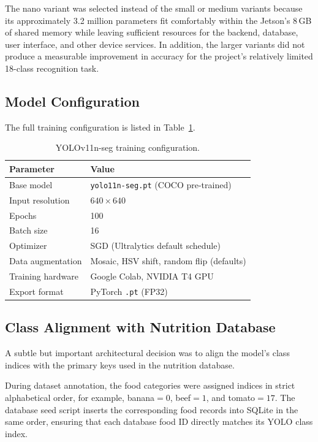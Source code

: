 \documentclass[11pt,a4paper]{article}
\begin{document}
The nano variant was selected instead of the small or medium variants because its approximately 3.2 million parameters fit comfortably within the Jetson's 8\,GB of shared memory while leaving sufficient resources for the backend, database, user interface, and other device services. In addition, the larger variants did not produce a measurable improvement in accuracy for the project's relatively limited 18-class recognition task.

\subsection{Model Configuration}

The full training configuration is listed in Table~\ref{tab:training}.

\begin{table}[H]
  \centering
  \caption{YOLOv11n-seg training configuration.}
  \label{tab:training}
  \begin{tabular}{ll}
    \toprule
    \textbf{Parameter} & \textbf{Value} \\
    \midrule
    Base model        & \texttt{yolo11n-seg.pt} (COCO pre-trained) \\
    Input resolution  & $640 \times 640$ \\
    Epochs            & 100 \\
    Batch size        & 16 \\
    Optimizer         & SGD (Ultralytics default schedule) \\
    Data augmentation & Mosaic, HSV shift, random flip (defaults) \\
    Training hardware & Google Colab, NVIDIA T4 GPU \\
    Export format     & PyTorch \texttt{.pt} (FP32) \\
    \bottomrule
  \end{tabular}
\end{table}

\subsection{Class Alignment with Nutrition Database}

A subtle but important architectural decision was to align the model's class indices with the primary keys used in the nutrition database.

During dataset annotation, the food categories were assigned indices in strict alphabetical order, for example, banana${}=0$, beef${}=1$, and tomato${}=17$. The database seed script inserts the corresponding food records into SQLite in the same order, ensuring that each database food ID directly matches its YOLO class index.
\end{document}
